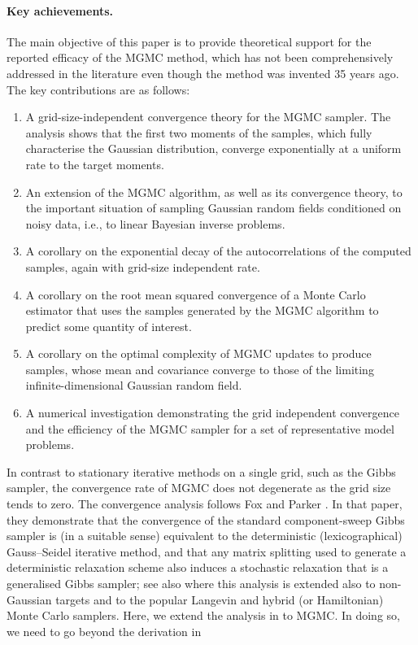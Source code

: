 \documentclass[11pt,english]{article}
\theoremstyle{plain}
\theoremstyle{plain}
\theoremstyle{plain}
\theoremstyle{plain}
\numberwithin{equation}{section}
\newcommand{\rev}[1]{#1}
\begin{document}
\paragraph{Key achievements.}
The main objective of this paper is to provide theoretical support for the reported efficacy of the MGMC method, which has not been comprehensively addressed in the literature even though the method was invented 35 years ago. The key contributions are as follows:
\begin{enumerate}
	\item A grid-size-independent convergence theory for the MGMC \rev{sampler}. %
	The analysis shows that the first two moments \rev{of the samples}, which fully characterise the Gaussian distribution, converge exponentially at a uniform rate to the target moments.
	\item An extension of the MGMC algorithm, as well as its convergence theory,
	to the important situation of sampling Gaussian random fields conditioned on noisy data, i.e., to linear Bayesian inverse problems.
	\item A corollary on the exponential decay of the autocorrelations of the computed samples, again with grid-size independent rate.
	\item \rev{A corollary on the root mean squared convergence of a Monte Carlo estimator that uses the samples generated by the MGMC algorithm to predict some quantity of interest.}
	\item A corollary on the optimal complexity of MGMC \rev{updates to produce samples, whose mean and covariance converge to those} of the limiting infinite-dimensional Gaussian random field.
	\item A numerical investigation demonstrating the grid independent convergence and the efficiency of the MGMC sampler for a set of representative model problems.
\end{enumerate}
In contrast to stationary iterative methods on a single grid, such as the Gibbs sampler, the convergence rate of MGMC does not degenerate as the grid size tends to zero. The convergence analysis follows Fox and Parker \cite{Fox.C_Parker_2017_AcceleratedGibbsSampling}. In that paper, they demonstrate that the convergence of the standard component-sweep Gibbs sampler is (in a suitable sense) equivalent to the deterministic (lexicographical) Gauss--Seidel iterative method, and that any matrix splitting used to generate a deterministic relaxation scheme also induces a stochastic relaxation that is a generalised Gibbs sampler; see also \cite{norton2016tuning} where this analysis is extended also to non-Gaussian targets and to the popular Langevin and hybrid (or Hamiltonian) Monte Carlo samplers. Here, we extend the analysis in \cite{Fox.C_Parker_2017_AcceleratedGibbsSampling} to MGMC. In doing so, we need to go beyond the derivation in \cite{goodman1989multigrid} 
\end{document}
